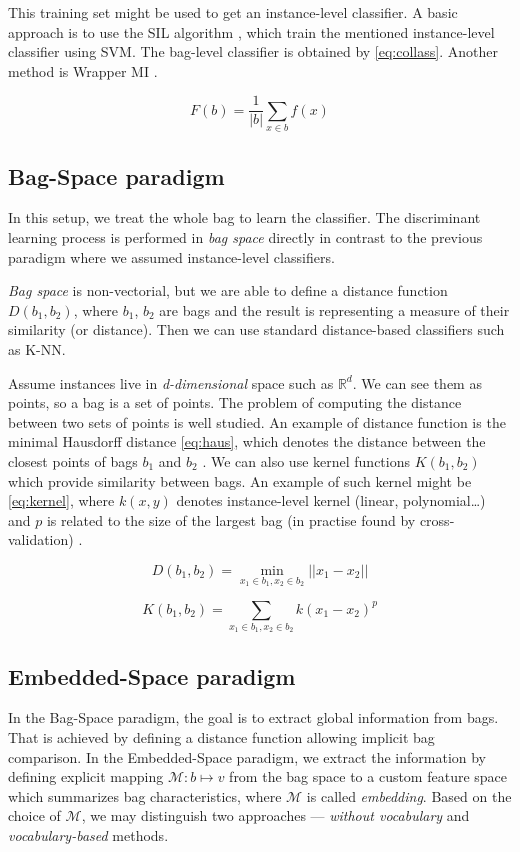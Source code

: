 This training set might be used to get an instance-level classifier. A basic approach is to use the SIL algorithm \cite{Bunescu2007}, which train the mentioned instance-level classifier using SVM. The bag-level classifier is obtained by \ref{eq:collass}. Another method is Wrapper MI \cite{Frank2003}.

\begin{equation} \label{eq:collass}
    F(b)=\frac{1}{|b|}\sum_{x\in b}f(x)
\end{equation}

\subsection{Bag-Space paradigm}
In this setup, we treat the whole bag to learn the classifier. The discriminant learning process is performed in \emph{bag space} directly in contrast to the previous paradigm where we assumed instance-level classifiers.

\emph{Bag space} is non-vectorial, but we are able to define a distance function $D(b_1,b_2)$, where $b_1$, $b_2$ are bags and the result is representing a measure of their similarity (or distance). Then we can use standard distance-based classifiers such as K-NN.

Assume instances live in \emph{d-dimensional} space such as $\mathbb{R}^{d}$. We can see them as points, so a bag is a set of points. The problem of computing the distance between two sets of points is well studied. An example of distance function is the minimal Hausdorff distance \ref{eq:haus}, which denotes the distance between the closest points of bags $b_1$ and $b_2$ \cite{Wang2000}. We can also use kernel functions $K(b_1,b_2)$ which provide similarity between bags. An example of such kernel might be \ref{eq:kernel}, where $k(x,y)$  denotes instance-level kernel (linear, polynomial\dots) and $p$ is related to the size of the largest bag (in practise found by cross-validation) \cite{Gartner2002}.

\begin{equation} \label{eq:haus}
    D(b_1,b_2)=\min_{x_1\in b_1, x_2\in b_2}||x_1-x_2||
\end{equation}

\begin{equation} \label{eq:kernel}
    K(b_1,b_2)=\sum_{x_1\in b_1, x_2\in b_2}k(x_1-x_2)^{p}
\end{equation}

\subsection{Embedded-Space paradigm}
In the Bag-Space paradigm, the goal is to extract global information from bags. That is achieved by defining a distance function allowing implicit bag comparison. In the Embedded-Space paradigm, we extract the information by defining explicit mapping $\mathcal{M}:b\mapsto v$ from the bag space to a custom feature space which summarizes bag characteristics,  where $\mathcal{M}$ is called \emph{embedding}. Based on the choice of $\mathcal{M}$, we may distinguish two approaches --- \emph{without vocabulary} and \emph{vocabulary-based} methods.

